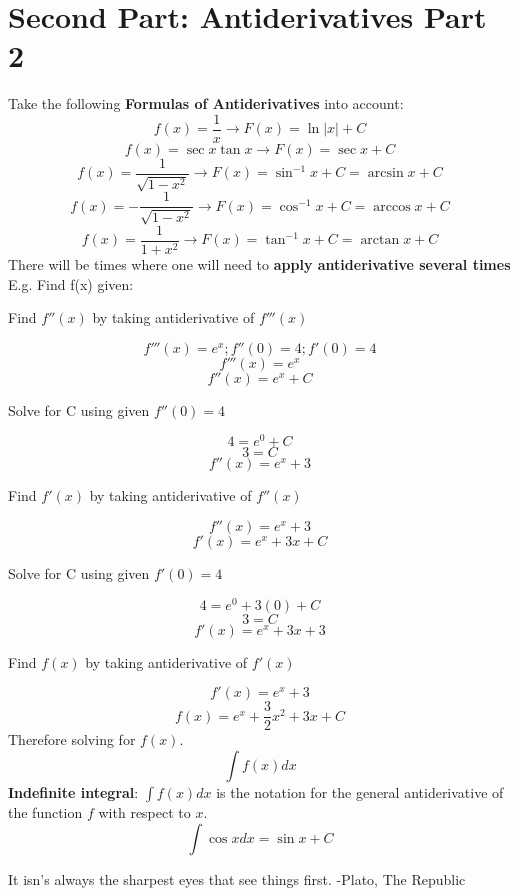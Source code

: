 \documentclass[12pt, letterpaper]{article}
\begin{document}
\section{Second Part: Antiderivatives Part 2}
Take the following \textbf{Formulas of Antiderivatives} into account:
\[f(x)=\frac{1}{x} \to F(x)=\ln{\lvert x \rvert}+C\]
\[f(x)=\sec{x}\tan{x} \to F(x)=\sec{x}+C\]
\[f(x)=\frac{1}{\sqrt{1-x^2}} \to F(x)=\sin^{-1}{x}+C=\arcsin{x}+C\]
\[f(x)=-\frac{1}{\sqrt{1-x^2}} \to F(x)=\cos^{-1}{x}+C=\arccos{x}+C\]
\[f(x)=\frac{1}{1+x^2} \to F(x)=\tan^{-1}{x}+C=\arctan{x}+C\]
There will be times where one will need to \textbf{apply antiderivative several times} E.g. Find f(x) given:
\begin{center}
    Find \(f''(x)\) by taking antiderivative of \(f'''(x)\)
\end{center}
\[f'''(x)=e^x; f''(0)=4; f'(0)=4\]
\[f'''(x)=e^x\]
\[f''(x)=e^x+C\]
\begin{center}
    Solve for C using given \(f''(0)=4\)
\end{center}
\[4=e^0+C\]
\[3=C\]
\[f''(x)=e^x+3\]
\begin{center}
    Find \(f'(x)\) by taking antiderivative of \(f''(x)\)
\end{center}
\[f''(x)=e^x+3\]
\[f'(x)=e^x+3x+C\]
\begin{center}
    Solve for C using given \(f'(0)=4\)
\end{center}
\[4=e^0+3(0)+C\]
\[3=C\]
\[f'(x)=e^x+3x+3\]
\begin{center}
    Find \(f(x)\) by taking antiderivative of \(f'(x)\)
\end{center}
\[f'(x)=e^x+3\]
\[f(x)=e^x+\frac{3}{2}x^2+3x+C\]
Therefore solving for \(f(x)\).
\[\int f(x)dx\]
\textbf{Indefinite integral}: \(\int f(x)dx\) is the notation for the general antiderivative of the function \(f\) with respect to \(x\).
\[\int \cos{x}dx = \sin{x}+C\]


It isn’s always the sharpest eyes that see things first.
-Plato, The Republic
\end{document}
